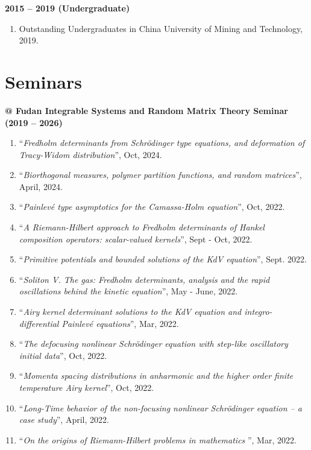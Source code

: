 \documentclass[margin]{res}
\begin{document}
\begin{resume}
\textbf{2015 -- 2019 (Undergraduate)}
\begin{enumerate}[--]
    \item Outstanding Undergraduates in China University of Mining and Technology, 2019.
\end{enumerate}


\section{Seminars}
\textbf{@ Fudan Integrable Systems and Random Matrix Theory Seminar (2019 -- 2026)}
\begin{enumerate}[--]
\item ``{\sl Fredholm determinants from Schr\"odinger type equations, and deformation of Tracy-Widom distribution}'', Oct, 2024.
\item ``{\sl Biorthogonal measures, polymer partition functions, and random matrices}'', April, 2024.
\item ``{\sl Painlev\'e type asymptotics for the Camassa-Holm equation}'', Oct, 2022.
\item ``{\sl A Riemann-Hilbert approach to Fredholm determinants of Hankel composition operators: scalar-valued kernels}'', Sept - Oct, 2022.
\item ``{\sl Primitive potentials and bounded solutions of the KdV equation}'', Sept. 2022.
\item ``{\sl Soliton V. The gas: Fredholm determinants, analysis and the rapid oscillations behind the kinetic equation}'', May - June, 2022.
\item ``{\sl Airy kernel determinant solutions to the KdV equation and integro-differential Painlev\'e equations}'', Mar, 2022.
\item ``{\sl The defocusing nonlinear Schr\"odinger equation with step-like oscillatory initial data}'', Oct, 2022.
\item ``{\sl Momenta spacing distributions in anharmonic and the higher order finite temperature Airy kernel}'', Oct, 2022.
\item ``{\sl Long-Time behavior of the non-focusing nonlinear Schr\"odinger equation -- a case study}'', April, 2022.
\item ``{\sl On the origins of Riemann-Hilbert problems in mathematics} '', Mar, 2022.
\end{enumerate}


\end{resume}
\end{document}
